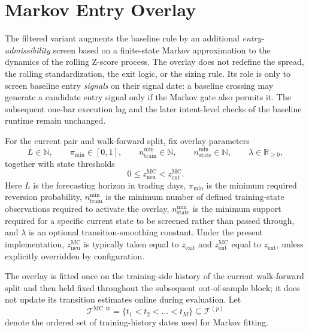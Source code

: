 \documentclass[11pt,a4paper]{article}
\begin{document}
\section{Markov Entry Overlay}

The filtered variant augments the baseline rule by an additional
\emph{entry-admissibility} screen based on a finite-state Markov approximation
to the dynamics of the rolling Z-score process. The overlay does not redefine
the spread, the rolling standardization, the exit logic, or the sizing rule.
Its role is only to screen baseline entry \emph{signals} on their signal date:
a baseline crossing may generate a candidate entry signal only if the Markov
gate also permits it. The subsequent one-bar execution lag and the later
intent-level checks of the baseline runtime remain unchanged.

For the current pair and walk-forward split, fix overlay parameters
\[
  L \in \mathbb N,
  \qquad
  \pi_{\min} \in [0,1],
  \qquad
  n_{\mathrm{train}}^{\min} \in \mathbb N,
  \qquad
  n_{\mathrm{state}}^{\min} \in \mathbb N,
  \qquad
  \lambda \in \mathbb R_{\ge 0},
\]
together with state thresholds
\[
  0 \le z_{\mathrm{neu}}^{\mathrm{MC}} < z_{\mathrm{ent}}^{\mathrm{MC}}.
\]
Here \(L\) is the forecasting horizon in trading days,
\(\pi_{\min}\) is the minimum required reversion probability,
\(n_{\mathrm{train}}^{\min}\) is the minimum number of defined training-state
observations required to activate the overlay,
\(n_{\mathrm{state}}^{\min}\) is the minimum support required for a specific
current state to be screened rather than passed through, and \(\lambda\) is an
optional transition-smoothing constant. Under the present implementation,
\(z_{\mathrm{neu}}^{\mathrm{MC}}\) is typically taken equal to
\(z_{\mathrm{exit}}\) and \(z_{\mathrm{ent}}^{\mathrm{MC}}\) equal to
\(z_{\mathrm{ent}}\), unless explicitly overridden by configuration.

The overlay is fitted once on the training-side history of the current
walk-forward split and then held fixed throughout the subsequent
out-of-sample block; it does not update its transition estimates online during
evaluation. Let
\[
  \mathcal T^{\mathrm{MC,tr}} = \{t_1 < t_2 < \dots < t_M\}
  \subseteq \mathcal T^{(p)}
\]
denote the ordered set of training-history dates used for Markov fitting.
\end{document}
